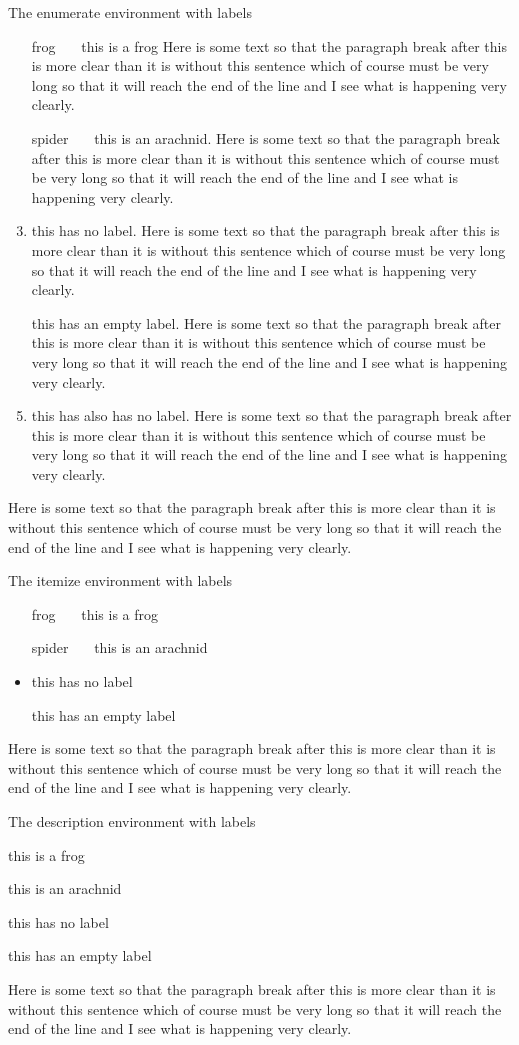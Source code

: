 \documentclass{article}
\begin{document}
The enumerate environment with labels
\begin{enumerate}
\item[frog~~~] this is a frog Here is some text so that the paragraph break after this
is more clear than it is without this sentence which of
course must be very long so that it will reach the end of
the line and I see what is happening very clearly.
\item[spider~~~] this is an arachnid. Here is some text so that the paragraph break after this
is more clear than it is without this sentence which of
course must be very long so that it will reach the end of
the line and I see what is happening very clearly.
\item this has no label. Here is some text so that the paragraph break after this
is more clear than it is without this sentence which of
course must be very long so that it will reach the end of
the line and I see what is happening very clearly.
\item[] this has an empty label. Here is some text so that the paragraph break after this
is more clear than it is without this sentence which of
course must be very long so that it will reach the end of
the line and I see what is happening very clearly.
\item this has also has no label. Here is some text so that the paragraph break after this
is more clear than it is without this sentence which of
course must be very long so that it will reach the end of
the line and I see what is happening very clearly.
\end{enumerate}
Here is some text so that the paragraph break after this
is more clear than it is without this sentence which of
course must be very long so that it will reach the end of
the line and I see what is happening very clearly.

The itemize environment with labels
\begin{itemize}
\item[frog~~~] this is a frog
\item[spider~~~] this is an arachnid
\item this has no label
\item[] this has an empty label
\end{itemize}
Here is some text so that the paragraph break after this
is more clear than it is without this sentence which of
course must be very long so that it will reach the end of
the line and I see what is happening very clearly.

The description environment with labels
\begin{description}
\item[frog~~~] this is a frog
\item[spider~~~] this is an arachnid
\item this has no label
\item[] this has an empty label
\end{description}
Here is some text so that the paragraph break after this
is more clear than it is without this sentence which of
course must be very long so that it will reach the end of
the line and I see what is happening very clearly.
\end{document}
